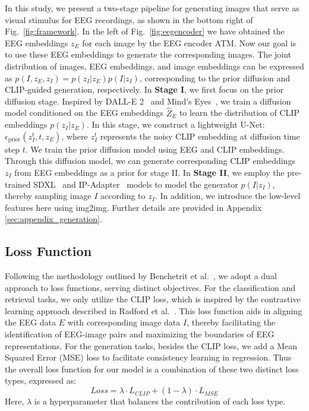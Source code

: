 \documentclass{article}
\begin{document}
In this study, we present a two-stage pipeline for generating images that serve as visual stimulus for EEG recordings, as shown in the bottom right of Fig.~\ref{fig:framework}. In the left of Fig.~\ref{fig:eegencoder} we have obtained the EEG embeddings \(z_E\) for each image by the EEG encoder ATM. Now our goal is to use these EEG embeddings to generate the corresponding images. The joint distribution of images, EEG embeddings, and image embeddings can be expressed as \(p(I, z_E, z_I) = p(z_I|z_E)p(I|z_I)\), corresponding to the prior diffusion and CLIP-guided generation, respectively.
In \textbf{Stage I}, we first focus on the prior diffusion stage. Inspired by DALL-E 2~\cite{ramesh2022hierarchical} and Mind’s Eyes~\cite{scotti2023reconstructing}, we train a diffusion model conditioned on the EEG embeddings \(\hat{Z}_E\) to learn the distribution of CLIP embeddings \(p(z_I|z_E)\). In this stage, we construct a lightweight U-Net: \(\epsilon_{\text{prior}}(z^t_I, t, z_E)\), where \(z^t_I\) represents the noisy CLIP embedding at diffusion time step \(t\). We train the prior diffusion model using EEG and CLIP embeddings. Through this diffusion model, we can generate corresponding CLIP embeddings \(z_I\) from EEG embeddings as a prior for stage II. In \textbf{Stage II}, we employ the pre-trained SDXL~\cite{podell2023sdxl} and IP-Adapter~\cite{ye2023ip} models to model the generator \(p(I|z_I)\), thereby sampling image \(I\) according to \(z_I\). In addition, we introduce the low-level features here using img2img\cite{meng2021sdedit}. Further details are provided in Appendix \ref{sec:appendix_generation}.


\subsection{Loss Function}

Following the methodology outlined by Benchetrit et al.~\cite{Benchetrit_2023}, we adopt a dual approach to loss functions, serving distinct objectives. For the classification and retrieval tasks, we only utilize the CLIP loss, which is inspired by the contrastive learning approach described in Radford et al.~\cite{radford2021learning}. This loss function aids in aligning the EEG data \(E\) with corresponding image data \(I\), thereby facilitating the identification of EEG-image pairs and maximizing the  boundaries of EEG representations. 
For the generation tasks, besides the CLIP loss, we add a Mean Squared Error (MSE) loss to facilitate consistency learning in regression.
Thus the overall loss function for our model is a combination of these two distinct loss types, expressed as:
\[
Loss = \lambda \cdot L_{CLIP} + (1 - \lambda) \cdot L_{MSE}
\]
Here, \(\lambda\) is a hyperparameter that balances the contribution of each loss type.
\end{document}
